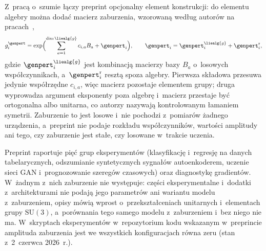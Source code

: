 Z~pracą o~szumie łączy preprint opcjonalny element konstrukcji: do elementu algebry można dodać macierz zaburzenia, wzorowaną według autorów na pracach~\cite{raubitzek_obfuscation_2025,raubitzek_quantum_noise},
\begin{equation}\label{eq:ns:lie-perturbed}
g_i^{\genpert}=\exp\Bigl(\sum_{a=1}^{\dim\liealg{g}}c_{i,a}B_a+\genpert_i\Bigr),\qquad \genpert_i=\genpert_i^{\liealg{g}}+\genpert_i^{\mathrm{r}},
\end{equation}
gdzie $\genpert_i^{\liealg{g}}$ jest kombinacją macierzy bazy $B_a$ o~losowych współczynnikach, a~$\genpert_i^{\mathrm{r}}$ resztą spoza algebry.
Pierwsza składowa przesuwa jedynie współrzędne $c_{i,a}$, więc macierz pozostaje elementem grupy; druga wyprowadza argument eksponenty poza algebrę i~macierz przestaje być ortogonalna albo unitarna, co autorzy nazywają kontrolowanym łamaniem symetrii.
Zaburzenie to jest losowe i~nie pochodzi z~pomiarów żadnego urządzenia, a~preprint nie podaje rozkładu współczynników, wartości amplitudy ani tego, czy zaburzenie jest stałe, czy losowane w~trakcie uczenia.

Preprint raportuje pięć grup eksperymentów (klasyfikację i~regresję na danych tabelarycznych, odszumianie syntetycznych sygnałów autoenkoderem, uczenie sieci GAN i~prognozowanie szeregów czasowych) oraz diagnostykę gradientów.
W~żadnym z~nich zaburzenie nie występuje: części eksperymentalne i~dodatki z~architekturami nie podają jego parametrów ani wariantu modelu z~zaburzeniem, opisy mówią wprost o~przekształceniach unitarnych i~elementach grupy $\mathrm{SU}(3)$, a~porównania tego samego modelu z~zaburzeniem i~bez niego nie ma.
W~skryptach eksperymentów w~repozytorium kodu wskazanym w~preprincie amplituda zaburzenia jest we wszystkich konfiguracjach równa zeru (stan z~2~czerwca 2026~r.).

